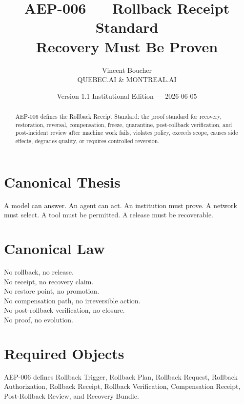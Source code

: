 \documentclass[11pt]{article}
\title{\textbf{AEP-006 --- Rollback Receipt Standard}\\\large Recovery Must Be Proven}
\author{Vincent Boucher\\QUEBEC.AI \& MONTREAL.AI}
\date{Version 1.1 Institutional Edition --- 2026-06-05}
\begin{document}
\maketitle

\begin{abstract}
AEP-006 defines the Rollback Receipt Standard: the proof standard for recovery, restoration, reversal, compensation, freeze, quarantine, post-rollback verification, and post-incident review after machine work fails, violates policy, exceeds scope, causes side effects, degrades quality, or requires controlled reversion.
\end{abstract}

\section*{Canonical Thesis}
A model can answer. An agent can act. An institution must prove. A network must select. A tool must be permitted. A release must be recoverable.

\section*{Canonical Law}
No rollback, no release.\\
No receipt, no recovery claim.\\
No restore point, no promotion.\\
No compensation path, no irreversible action.\\
No post-rollback verification, no closure.\\
No proof, no evolution.

\section{Required Objects}
AEP-006 defines Rollback Trigger, Rollback Plan, Rollback Request, Rollback Authorization, Rollback Receipt, Rollback Verification, Compensation Receipt, Post-Rollback Review, and Recovery Bundle.
\end{document}
